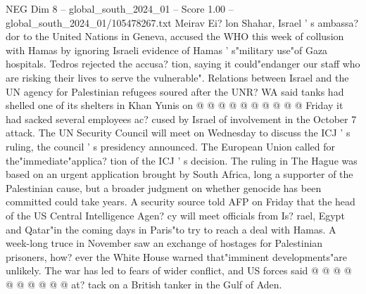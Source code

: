 \begin{textsample}{NEG Dim 8 – global\_south\_2024\_01 – Score 1.00 – global\_south\_2024\_01/105478267.txt}
Meirav Ei? lon Shahar, Israel ' s ambassa? dor to the United Nations in Geneva, accused the WHO this week of collusion with Hamas by ignoring Israeli evidence of Hamas ' s"military use"of Gaza hospitals.
Tedros rejected the accusa? tion, saying it could"endanger our staff who are risking their lives to serve the vulnerable".
Relations between Israel and the UN agency for Palestinian refugees soured after the UNR?
WA said tanks had shelled one of its shelters in Khan Yunis on @ @ @ @ @ @ @ @ @ @ Friday it had sacked several employees ac? cused by Israel of involvement in the October 7 attack.
The UN Security Council will meet on Wednesday to discuss the ICJ ' s ruling, the council ' s presidency announced.
The European Union called for the"immediate"applica? tion of the ICJ ' s decision.
The ruling in The Hague was based on an urgent application brought by South Africa, long a supporter of the Palestinian cause, but a broader judgment on whether genocide has been committed could take years.
A security source told AFP on Friday that the head of the US Central Intelligence Agen? cy will meet officials from Is? rael, Egypt and Qatar"in the coming days in Paris"to try to reach a deal with Hamas.
A week-long truce in November saw an exchange of hostages for Palestinian prisoners, how? ever the White House warned that"imminent developments"are unlikely.
The war has led to fears of wider conflict, and US forces said @ @ @ @ @ @ @ @ @ @ at? tack on a British tanker in the Gulf of Aden.

\end{textsample}
